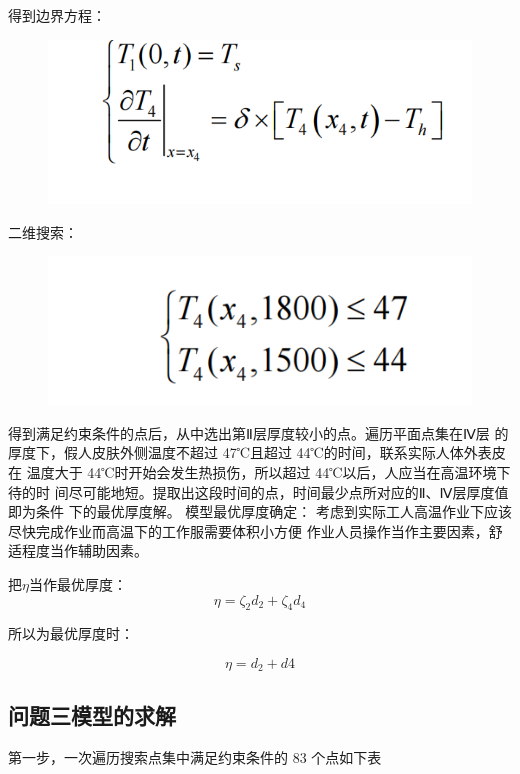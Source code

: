 \documentclass{article}
\begin{document}
	得到边界方程：
	
	\begin{figure}[htbp]
		\centering
		\includegraphics[scale=0.4]{屏幕截图 2024-07-15 223032.png}
	\end{figure}
	
	二维搜索：
	
	\begin{figure}[htbp]
		\centering
		\includegraphics[scale=0.4]{屏幕截图 2024-07-15 223035.png}
	\end{figure}
	
	得到满足约束条件的点后，从中选出第Ⅱ层厚度较小的点。遍历平面点集在Ⅳ层
	的厚度下，假人皮肤外侧温度不超过 47℃且超过 44℃的时间，联系实际人体外表皮在
	温度大于 44℃时开始会发生热损伤，所以超过 44℃以后，人应当在高温环境下待的时
	间尽可能地短。提取出这段时间的点，时间最少点所对应的Ⅱ、Ⅳ层厚度值即为条件
	下的最优厚度解。 
	模型最优厚度确定： 
	考虑到实际工人高温作业下应该尽快完成作业而高温下的工作服需要体积小方便
	作业人员操作当作主要因素，舒适程度当作辅助因素。
	
	把$\eta $当作最优厚度：$$\eta = \zeta _{2}d_{2}+\zeta _{4}d_{4}$$
	
	所以为最优厚度时：
	
	$$\eta  = d_{2}+d{4}$$
	
	\subsection{ 问题三模型的求解}
	
	第一步，一次遍历搜索点集中满足约束条件的 83 个点如下表
	
\end{document}
